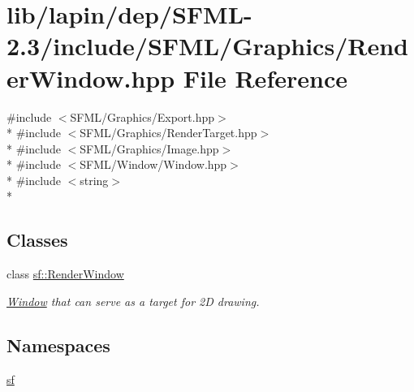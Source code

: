 \hypertarget{lapin_2dep_2_s_f_m_l-2_83_2include_2_s_f_m_l_2_graphics_2_render_window_8hpp}{\section{lib/lapin/dep/\-S\-F\-M\-L-\/2.3/include/\-S\-F\-M\-L/\-Graphics/\-Render\-Window.hpp File Reference}
\label{lapin_2dep_2_s_f_m_l-2_83_2include_2_s_f_m_l_2_graphics_2_render_window_8hpp}
}
{\ttfamily \#include $<$S\-F\-M\-L/\-Graphics/\-Export.\-hpp$>$}\\*
{\ttfamily \#include $<$S\-F\-M\-L/\-Graphics/\-Render\-Target.\-hpp$>$}\\*
{\ttfamily \#include $<$S\-F\-M\-L/\-Graphics/\-Image.\-hpp$>$}\\*
{\ttfamily \#include $<$S\-F\-M\-L/\-Window/\-Window.\-hpp$>$}\\*
{\ttfamily \#include $<$string$>$}\\*
\subsection*{Classes}
\begin{DoxyCompactItemize}
\item 
class \hyperlink{classsf_1_1_render_window}{sf\-::\-Render\-Window}
\begin{DoxyCompactList}\small\item\em \hyperlink{classsf_1_1_window}{Window} that can serve as a target for 2\-D drawing. \end{DoxyCompactList}\end{DoxyCompactItemize}
\subsection*{Namespaces}
\begin{DoxyCompactItemize}
\item 
\hyperlink{namespacesf}{sf}
\end{DoxyCompactItemize}
